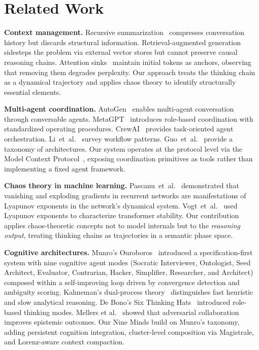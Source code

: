 \documentclass[journal,10pt]{IEEEtran}
\begin{document}
\section{Related Work}
\label{sec:related}

\textbf{Context management.} Recursive summarization~\cite{wu2021recursively} compresses conversation history but discards structural information. Retrieval-augmented generation~\cite{lewis2020rag} sidesteps the problem via external vector stores but cannot preserve causal reasoning chains. Attention sinks~\cite{xiao2024efficient} maintain initial tokens as anchors, observing that removing them degrades perplexity. Our approach treats the thinking chain as a dynamical trajectory and applies chaos theory to identify structurally essential elements.

\textbf{Multi-agent coordination.} AutoGen~\cite{wu2023autogen} enables multi-agent conversation through conversable agents. MetaGPT~\cite{hong2023metagpt} introduces role-based coordination with standardized operating procedures. CrewAI~\cite{crewai2024} provides task-oriented agent orchestration. Li~et~al.~\cite{li2024multiagent} survey workflow patterns. Guo~et~al.~\cite{guo2024ijcai} provide a taxonomy of architectures. Our system operates at the protocol level via the Model Context Protocol~\cite{mcp2024,mcpspec2025}, exposing coordination primitives as tools rather than implementing a fixed agent framework.

\textbf{Chaos theory in machine learning.} Pascanu~et~al.~\cite{pascanu2013difficulty} demonstrated that vanishing and exploding gradients in recurrent networks are manifestations of Lyapunov exponents in the network's dynamical system. Vogt~et~al.~\cite{vogt2022lyapunov} used Lyapunov exponents to characterize transformer stability. Our contribution applies chaos-theoretic concepts not to model internals but to the \emph{reasoning output}, treating thinking chains as trajectories in a semantic phase space.

\textbf{Cognitive architectures.} Munro's Ouroboros~\cite{munro_ouroboros} introduced a specification-first system with nine cognitive agent modes (Socratic Interviewer, Ontologist, Seed Architect, Evaluator, Contrarian, Hacker, Simplifier, Researcher, and Architect) composed within a self-improving loop driven by convergence detection and ambiguity scoring. Kahneman's dual-process theory~\cite{kahneman2011} distinguishes fast heuristic and slow analytical reasoning. De Bono's Six Thinking Hats~\cite{debono1985} introduced role-based thinking modes. Mellers et al.~\cite{mellers2001} showed that adversarial collaboration improves epistemic outcomes. Our Nine Minds build on Munro's taxonomy, adding persistent cognition integration, cluster-level composition via Magistrale, and Lorenz-aware context compaction.
\end{document}
